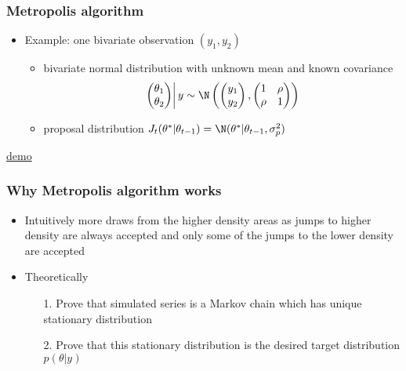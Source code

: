 \documentclass[10pt]{beamer}
\begin{document}
\begin{frame}

\frametitle{ Metropolis algorithm}

  \begin{itemize}
  \item Example: one bivariate observation $(y_1,y_2)$
    \begin{itemize}
    \item bivariate normal distribution with unknown mean and known
      covariance
       \begin{equation*}
         \left.
         \begin{pmatrix}
           \theta_1\\
           \theta_2
         \end{pmatrix}
         \right| y \sim
         \N\left(
           \begin{pmatrix}
             y_1\\
             y_2
           \end{pmatrix},
           \begin{pmatrix}
             1 & \rho\\
             \rho & 1
         \end{pmatrix}
       \right)
       \end{equation*}
     \item proposal distribution
       $J_t(\theta^{*}|\theta_{t-1})=\N(\theta^{*}|\theta_{t-1},\sigma_p^2)$
     \end{itemize}
   \end{itemize}

  \center
  \href{https://chi-feng.github.io/mcmc-demo/app.html?algorithm=RandomWalkMH&target=standard}{demo}

\end{frame}

 \begin{frame}

\frametitle{Why Metropolis algorithm works}

  \begin{itemize}
  \item Intuitively more draws from the higher density areas as
    jumps to higher density are always accepted and only some of the
    jumps to the lower density are accepted
    \vspace{5mm}
    \pause
  \item Theoretically
    \begin{itemize}
    \item[1.] Prove that simulated series is a Markov chain
      which has unique stationary distribution
    \item[2.] Prove that this stationary distribution is the desired target distribution $p(\theta|y)$
    \end{itemize}
\end{itemize}

\end{frame}
\end{document}
